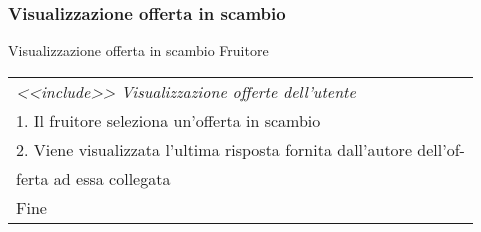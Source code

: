 \begin{minipage}{\textwidth}
    \subsubsection{Visualizzazione offerta in scambio}
    \usecase
        {Visualizzazione offerta in scambio}
        {
            Fruitore
        }
        {
            \begin{tabular}{l}
                \textit{<<include>> Visualizzazione offerte dell'utente}\\
                1. Il fruitore seleziona un'offerta in scambio\\
                2. Viene visualizzata l'ultima risposta fornita dall'autore dell'of-\\
                ferta ad essa collegata\\
                Fine
            \end{tabular}\\

        }
        \vspace{0.5cm}
\end{minipage}